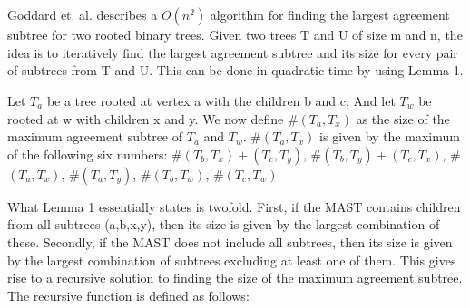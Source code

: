 \chapter{}
Goddard et. al.\cite{nsquared} describes a $O(n^2)$ algorithm for finding the largest agreement subtree for two rooted binary trees. Given two trees T and U of size m and n, the idea is to iteratively find the largest agreement subtree and its size for every pair of subtrees from T and U. This can be done in quadratic time by using Lemma 1. 

\begin{Lemma}
	Let $T_a$ be a tree rooted at vertex a with the children b and c; And let $T_w$ be rooted at w with children x and y. We now define $\#(T_a,T_x)$ as the size of the maximum agreement subtree of $T_a$ and $T_w$.  $\#(T_a,T_x)$ is given by the maximum of the following six numbers: \#$(T_b,T_x)+(T_c,T_y)$,
	\#$(T_b,T_y)+(T_c,T_x)$,
	\#$(T_a,T_x)$,
	\#$(T_a,T_y)$,
	\#$(T_b,T_w)$,
	\#$(T_c,T_w)$
\end{Lemma}

What Lemma 1 essentially states is twofold. First, if the MAST contains children from all subtrees (a,b,x,y), then its size is given by the largest combination of these. Secondly, if the MAST does not include all subtrees, then its size is given by the largest combination of subtrees excluding at least one of them.    
This gives rise to a recursive solution to finding the size of the maximum agreement subtree. The recursive function is defined as follows: 

